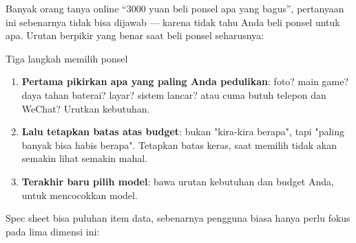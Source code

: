 


Banyak orang tanya online “3000 yuan beli ponsel apa yang bagus”, pertanyaan ini sebenarnya tidak bisa dijawab — karena tidak tahu Anda beli ponsel untuk apa. Urutan berpikir yang benar saat beli ponsel seharusnya:

\begin{tcbinfo}{Tiga langkah memilih ponsel}
\begin{enumerate}
  \item \textbf{Pertama pikirkan apa yang paling Anda pedulikan}: foto? main game? daya tahan baterai? layar? sistem lancar? atau cuma butuh telepon dan WeChat? Urutkan kebutuhan.
  \item \textbf{Lalu tetapkan batas atas budget}: bukan "kira-kira berapa", tapi "paling banyak bisa habis berapa". Tetapkan batas keras, saat memilih tidak akan semakin lihat semakin mahal.
  \item \textbf{Terakhir baru pilih model}: bawa urutan kebutuhan dan budget Anda, untuk mencocokkan model.
\end{enumerate}

\end{tcbinfo}


Spec sheet bisa puluhan item data, sebenarnya pengguna biasa hanya perlu fokus pada lima dimensi ini:

